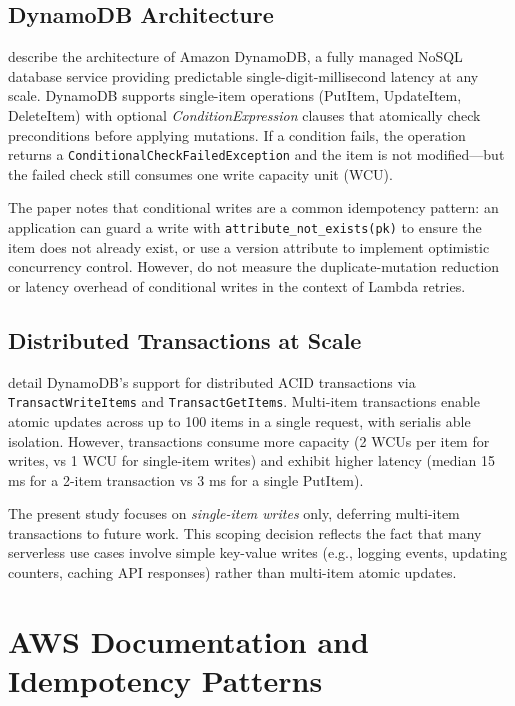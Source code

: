 \subsection{DynamoDB Architecture}

\citet{Elhemali2022DynamoDB} describe the architecture of Amazon DynamoDB, a fully managed NoSQL database service providing predictable single-digit-millisecond latency at any scale. DynamoDB supports single-item operations (PutItem, UpdateItem, DeleteItem) with optional \textit{ConditionExpression} clauses that atomically check preconditions before applying mutations. If a condition fails, the operation returns a \texttt{ConditionalCheckFailedException} and the item is not modified---but the failed check still consumes one write capacity unit (WCU).

The paper notes that conditional writes are a common idempotency pattern: an application can guard a write with \texttt{attribute\_not\_exists(pk)} to ensure the item does not already exist, or use a version attribute to implement optimistic concurrency control. However, \citet{Elhemali2022DynamoDB} do not measure the duplicate-mutation reduction or latency overhead of conditional writes in the context of Lambda retries.

\subsection{Distributed Transactions at Scale}

\citet{Idziorek2023DynamoDBTx} detail DynamoDB's support for distributed ACID transactions via \texttt{TransactWriteItems} and \texttt{TransactGetItems}. Multi-item transactions enable atomic updates across up to 100 items in a single request, with serialis able isolation. However, transactions consume more capacity (2 WCUs per item for writes, vs 1 WCU for single-item writes) and exhibit higher latency (median 15 ms for a 2-item transaction vs 3 ms for a single PutItem).

The present study focuses on \textit{single-item writes} only, deferring multi-item transactions to future work. This scoping decision reflects the fact that many serverless use cases involve simple key-value writes (e.g., logging events, updating counters, caching API responses) rather than multi-item atomic updates.

\section{AWS Documentation and Idempotency Patterns}

